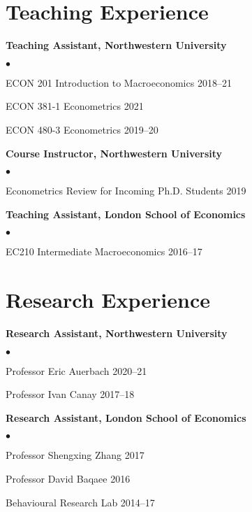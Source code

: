 \documentclass[margin,line]{res}
\newenvironment{list1}{
  \begin{list}{\ding{113}}{%
      \setlength{\itemsep}{.025in}
      \setlength{\parsep}{0in} \setlength{\parskip}{0in}
      \setlength{\topsep}{0in} \setlength{\partopsep}{0in}
      \setlength{\leftmargin}{0.17in}}}{\end{list}}
\newenvironment{list2}{
  \begin{list}{$\bullet$}{%
      \setlength{\itemsep}{0in}
      \setlength{\parsep}{0in} \setlength{\parskip}{0in}
      \setlength{\topsep}{0in} \setlength{\partopsep}{0in}
      \setlength{\leftmargin}{0.2in}}}{\end{list}}
\begin{document}
\begin{resume}
\section{Teaching Experience}
\begin{list1}
\item[] \textbf{Teaching Assistant, Northwestern University} 
	\begin{list2}
		\item[] ECON 201 Introduction to Macroeconomics \hfill 2018--21
		\item[] ECON 381-1 Econometrics  \hfill 2021
		\item[] ECON 480-3 Econometrics  \hfill 2019--20 \\[-2ex]
	\end{list2}
\item[] \textbf{Course Instructor, Northwestern University}
	\begin{list2}
		\item[] Econometrics Review for Incoming Ph.D. Students \hfill 2019 \\[-2ex]
	\end{list2}
\item[] \textbf{Teaching Assistant, London School of Economics}
	\begin{list2}
		\item[] EC210 Intermediate Macroeconomics \hfill 2016--17
	\end{list2}	
\end{list1}
\vspace*{.05in}


\section{Research Experience}
\begin{list1}
\item[] \textbf{Research Assistant, Northwestern University} 
\begin{list2}
	\item[] Professor Eric Auerbach \hfill 2020--21
	\item[] Professor Ivan Canay \hfill 2017--18 \\[-2ex]
\end{list2}  
\item[] \textbf{Research Assistant, London School of Economics} 
\begin{list2}
	\item[] Professor Shengxing Zhang \hfill 2017
	\item[] Professor David Baqaee \hfill 2016
	\item[] Behavioural Research Lab \hfill 2014--17
\end{list2}  
\end{list1}
\vspace*{.05in}


\end{resume}
\end{document}

